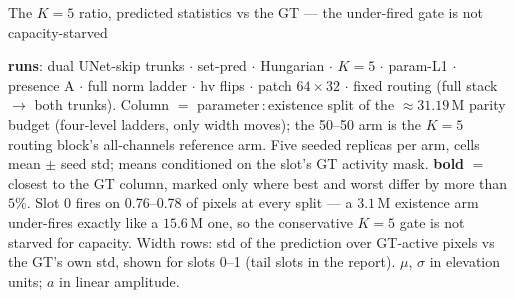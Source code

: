 \begin{frame}{The $K{=}5$ ratio, predicted statistics vs the GT --- the under-fired gate is not capacity-starved}
  \parbox{0.82\textwidth}{\tiny\color{soft} \textbf{runs}: dual UNet-skip trunks $\cdot$ set-pred $\cdot$ Hungarian $\cdot$ $K{=}5$ $\cdot$ param-L1 $\cdot$ presence A $\cdot$ full norm ladder $\cdot$ hv flips $\cdot$ patch $64{\times}32$ $\cdot$ fixed routing (full stack $\to$ both trunks). Column $=$ parameter\,:\,existence split of the ${\approx}31.19$\,M parity budget (four-level ladders, only width moves); the 50--50 arm is the $K{=}5$ routing block's all-channels reference arm. Five seeded replicas per arm, cells mean $\pm$ seed std; means conditioned on the slot's GT activity mask. \textbf{bold} $=$ closest to the \textcolor{good}{GT} column, marked only where best and worst differ by more than $5\%$. Slot 0 fires on 0.76--0.78 of pixels at every split --- a $3.1$\,M existence arm under-fires exactly like a $15.6$\,M one, so the conservative $K{=}5$ gate is not starved for capacity. Width rows: std of the prediction over GT-active pixels vs the GT's own std, shown for slots 0--1 (tail slots in the report). $\mu$, $\sigma$ in elevation units; $a$ in linear amplitude.\par}
\end{frame}

